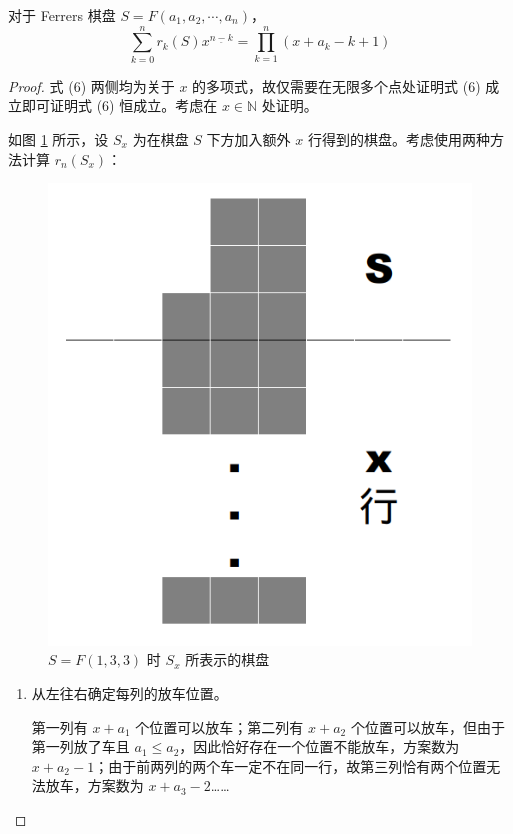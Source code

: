 \documentclass{noithesis}
\begin{document}
	\begin{theorem}\label{xiajiangmi}
		对于 Ferrers 棋盘 $S = F(a_1,a_2,\cdots,a_n)$，\begin{equation}
		\sum_{k=0}^n r_k(S)x^{\underline{n-k}} = \prod_{k=1}^n (x+a_k-k+1)
		\end{equation}
	\end{theorem}
	\begin{proof}
		式 (6) 两侧均为关于 $x$ 的多项式，故仅需要在无限多个点处证明式 (6) 成立即可证明式 (6) 恒成立。考虑在 $x \in \mathbb{N}$ 处证明。
		
		如图 \ref{f5} 所示，设 $S_x$ 为在棋盘 $S$ 下方加入额外 $x$ 行得到的棋盘。考虑使用两种方法计算 $r_n(S_x)$：
		\begin{figure}[h]
			\centering
			\caption{$S = F(1,3,3)$ 时 $S_x$ 所表示的棋盘}
			\label{f5}
			\includegraphics[scale=0.3]{picture/figure5.png}
		\end{figure}
		\begin{enumerate}
			\item 从左往右确定每列的放车位置。
			
			第一列有 $x+a_1$ 个位置可以放车；第二列有 $x+a_2$ 个位置可以放车，但由于第一列放了车且 $a_1 \leq a_2$，因此恰好存在一个位置不能放车，方案数为 $x+a_2-1$；由于前两列的两个车一定不在同一行，故第三列恰有两个位置无法放车，方案数为 $x+a_3-2$……
			

\end{enumerate}
\end{proof}
\end{document}
